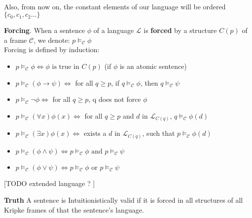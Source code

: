 \documentclass[runningheads]{llncs}
\begin{document}
    \\Also, from now on, the constant elements of our language will be ordered $\{c_0, c_1, c_2 ...\}$


\begin{definition}\textbf{Forcing}.
          When a sentence $\phi$ of a language $\mathcal{L}$ is \textbf{forced} by a structure $C(p)$ of a frame $\mathcal{C}$, we denote:
        $ p \vDash_{\mathcal{C}} \phi$ \\
         Forcing is defined by induction: \cite{book1}



        \begin{itemize}
            \item    $ p \vDash_{\mathcal{C}} \phi                 \Leftrightarrow \phi \text{ is true in } C(p)$ (if $\phi$ is an atomic sentence)\\
            \item    $ p \vDash_{\mathcal{C}} (\phi \to \psi)      \Leftrightarrow$   for all $q \geq p$, if $q \vDash_{\mathcal{C}} \phi$, then $q \vDash_{\mathcal{C}} \psi$
            \item    $ p \vDash_{\mathcal{C}} \neg \phi            \Leftrightarrow $  for all $q \geq p$, q does not force $\phi$\\
            \item    $ p \vDash_{\mathcal{C}} (\forall x) \phi(x)  \Leftrightarrow $  for all $q \geq p$ and $d$ in $\mathcal{L}_{C(q)}$, $q \vDash_{\mathcal{C}} \phi(d)$ \\
            \item    $ p \vDash_{\mathcal{C}} (\exists x) \phi(x)  \Leftrightarrow $  exists a $d$ in  $\mathcal{L}_{C(q)}$, such that $p \vDash_{\mathcal{C}} \phi(d)$\\
            \item    $ p \vDash_{\mathcal{C}} (\phi \land \psi)    \Leftrightarrow p \vDash_{\mathcal{C}} \phi \text{ and } p \vDash_{\mathcal{C}} \psi$ \\
            \item    $ p \vDash_{\mathcal{C}} (\phi \lor \psi)     \Leftrightarrow p \vDash_{\mathcal{C}} \phi$ or $p \vDash_{\mathcal{C}} \psi$ \\

        \end{itemize}
\end{definition}

[TODO extended language ? ] 
\begin{definition}
    \textbf{Truth}
    A sentence is Intuitionistically valid if it is forced in all structures of all Kripke
        frames of that the sentence's language.
\end{definition}
\end{document}
